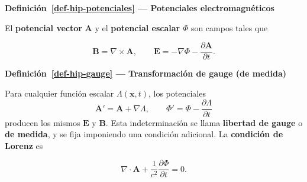 \documentclass[
  spanish,
  a4paper,
]{scrbook}
\theoremstyle{definition}
\theoremstyle{plain}
\theoremstyle{definition}
\theoremstyle{plain}
\theoremstyle{definition}
\theoremstyle{remark}
\begin{document}
\begin{tcolorbox}[enhanced jigsaw, arc=.35mm, bottomrule=.15mm, breakable, colback=white, colframe=quarto-callout-note-color-frame, left=2mm, leftrule=.75mm, opacityback=0, rightrule=.15mm, toprule=.15mm]
\begin{minipage}[t]{5.5mm}
\textcolor{quarto-callout-note-color}{\faInfo}
\end{minipage}%
\begin{minipage}[t]{\textwidth - 5.5mm}

\vspace{-3mm}\textbf{Definición~\ref{def-hip-potenciales} --- Potenciales electromagnéticos}\vspace{3mm}

El \textbf{potencial vector} \(\mathbf A\) y el \textbf{potencial
escalar} \(\Phi\) son campos tales que

\[
\mathbf B = \nabla\times\mathbf A, \qquad \mathbf E = -\nabla\Phi - \frac{\partial\mathbf A}{\partial t}.
\]

\end{minipage}%
\end{tcolorbox}

\begin{tcolorbox}[enhanced jigsaw, arc=.35mm, bottomrule=.15mm, breakable, colback=white, colframe=quarto-callout-note-color-frame, left=2mm, leftrule=.75mm, opacityback=0, rightrule=.15mm, toprule=.15mm]
\begin{minipage}[t]{5.5mm}
\textcolor{quarto-callout-note-color}{\faInfo}
\end{minipage}%
\begin{minipage}[t]{\textwidth - 5.5mm}

\vspace{-3mm}\textbf{Definición~\ref{def-hip-gauge} --- Transformación de gauge (de medida)}\vspace{3mm}

Para cualquier función escalar \(\Lambda(\mathbf x,t)\), los potenciales
\[
\mathbf A' = \mathbf A + \nabla\Lambda, \qquad \Phi' = \Phi - \frac{\partial\Lambda}{\partial t}
\] producen los mismos \(\mathbf E\) y \(\mathbf B\). Esta
indeterminación se llama \textbf{libertad de gauge} o \textbf{de
medida}, y se fija imponiendo una condición adicional. La
\textbf{condición de Lorenz} es

\[
\nabla\cdot\mathbf A + \frac{1}{c^2}\frac{\partial\Phi}{\partial t} = 0 .
\]

\end{minipage}%
\end{tcolorbox}
\end{document}
